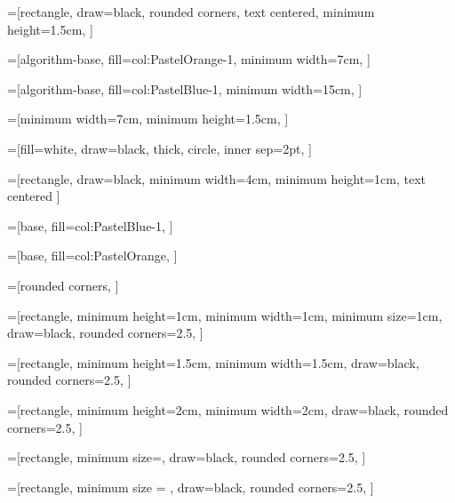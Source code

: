 \usetikzlibrary{calc, intersections, angles, positioning, decorations.pathreplacing, shapes.arrows, fadings}


=[rectangle,
                            draw=black,
                            rounded corners,
                            text centered,
                            minimum height=1.5cm,
]

=[algorithm-base,
                           fill={col:PastelOrange-1},
                           minimum width=7cm,
]

=[algorithm-base,
                            fill={col:PastelBlue-1},
                            minimum width=15cm,
]

=[minimum width=7cm,
                    minimum height=1.5cm,
]

=[fill=white,
                         draw=black,
                         thick,
                         circle,
                         inner sep=2pt,
]
                         
=[rectangle,
                  draw=black,
                  minimum width=4cm,
                  minimum height=1cm,
                  text centered
]
                           
=[base,
                          fill={col:PastelBlue-1},
]

=[base,
                   fill={col:PastelOrange},
]

=[rounded corners,
]

=[rectangle,
                           minimum height=1cm, 
                           minimum width=1cm, 
                           minimum size=1cm,
                           draw=black,
                           rounded corners=2.5,
]

=[rectangle,
                          minimum height=1.5cm, 
                          minimum width=1.5cm, 
                          draw=black,
                          rounded corners=2.5,
]

=[rectangle, 
                              minimum height=2cm, 
                              minimum width=2cm, 
                              draw=black,
                              rounded corners=2.5,
]

=[rectangle,
                              minimum size=,
                              draw=black,
                              rounded corners=2.5,
]

=[rectangle,
                             minimum size = ,
                             draw=black,
                             rounded corners=2.5,
]
